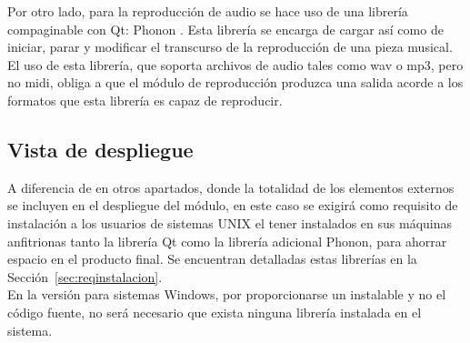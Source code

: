 Por otro lado, para la reproducción de audio se hace uso de una librería compaginable con Qt: Phonon . Esta librería se encarga de cargar así como de iniciar, parar y modificar el transcurso de la reproducción de una pieza musical. El uso de esta librería, que soporta archivos de audio tales como wav o mp3, pero no midi, obliga a que el módulo de reproducción produzca una salida acorde a los formatos que esta librería es capaz de reproducir.

\subsection{Vista de despliegue}

A diferencia de en otros apartados, donde la totalidad de los elementos externos se incluyen en el despliegue del módulo, en este caso se exigirá como requisito de instalación a los usuarios de sistemas UNIX el tener instalados en sus máquinas anfitrionas tanto la librería Qt como la librería adicional Phonon, para ahorrar espacio en el producto final. Se encuentran detalladas estas librerías en la Sección~\ref{sec:reqinstalacion}.\\

En la versión para sistemas Windows, por proporcionarse un instalable y no el código fuente, no será necesario que exista ninguna librería instalada en el sistema.\\